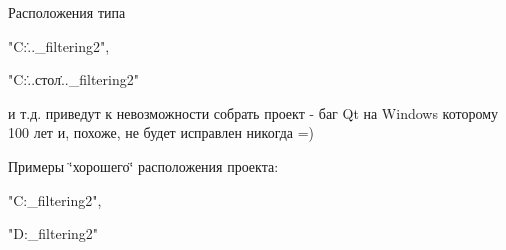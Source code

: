 Расположения типа \begin{DoxyVerb}  "C:\...\optimal_filtering2",

  "C:\... стол\...\optimal_filtering2" 
\end{DoxyVerb}


и т.\+д. приведут к невозможности собрать проект -\/ баг Qt на Windows которому 100 лет и, похоже, не будет исправлен никогда =)

Примеры \char`\"{}хорошего\char`\"{} расположения проекта\+: \begin{DoxyVerb}  "C:\Workspace\optimal_filtering2", 

  "D:\optimal_filtering2" \end{DoxyVerb}
 